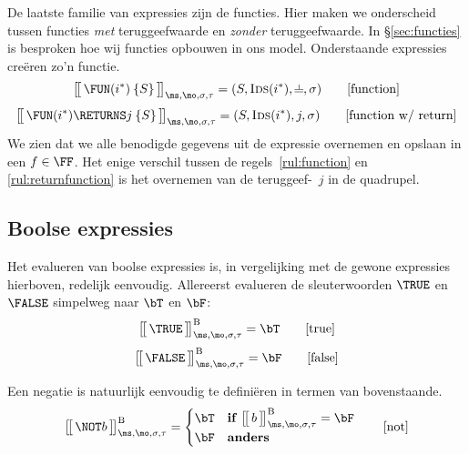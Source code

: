 De laatste familie van expressies zijn de functies. Hier maken we onderscheid tussen functies \emph{met} teruggeefwaarde en \emph{zonder} teruggeefwaarde. In §\ref{sec:functies} is besproken hoe wij functies opbouwen in ons model. Onderstaande expressies creëren zo'n functie.
%
\begin{equation}
  \Express{\FUN (i^*) \: \{S\}}{\ms,\mo,\sigma,\tau} = (S, \textsc{Ids}(i^*), \nil, \sigma)
  \tag*{[function]}\label{rul:function}
\end{equation}
%
\begin{equation}
  \Express{\FUN (i^*) \RETURNS j \: \{S\}}{\ms,\mo,\sigma,\tau} = (S, \textsc{Ids}(i^*), j, \sigma)
  \tag*{[function w/ return]}\label{rul:returnfunction}
\end{equation}
%
We zien dat we alle benodigde gegevens uit de expressie overnemen en opslaan in een $f\in\FF$. Het enige verschil tussen de regels~\ref{rul:function} en \ref{rul:returnfunction} is het overnemen van de teruggeef-\Id\ $j$ in de quadrupel.

\subsection{Boolse expressies}

Het evalueren van boolse expressies is, in vergelijking met de gewone expressies hierboven, redelijk eenvoudig. Allereerst evalueren de sleuterwoorden $\TRUE$ en $\FALSE$ simpelweg naar $\bT$ en $\bF$:
%
\begin{equation}
  \Express[B]{\TRUE}{\ms,\mo,\sigma,\tau} = \bT
  \tag*{[true]}
\end{equation}
%
\begin{equation}
  \Express[B]{\FALSE}{\ms,\mo,\sigma,\tau} = \bF
  \tag*{[false]}
\end{equation}

Een negatie is natuurlijk eenvoudig te definiëren in termen van bovenstaande.
%
\begin{equation}
  \Express[B]{\NOT b}{\ms,\mo,\sigma,\tau}
  = \begin{cases}
    \bT & \textbf{if } \Express[B]{b}{\ms,\mo,\sigma,\tau} = \bF \\
    \bF & \textbf{anders}
  \end{cases}
  \tag*{[not]}
\end{equation}

